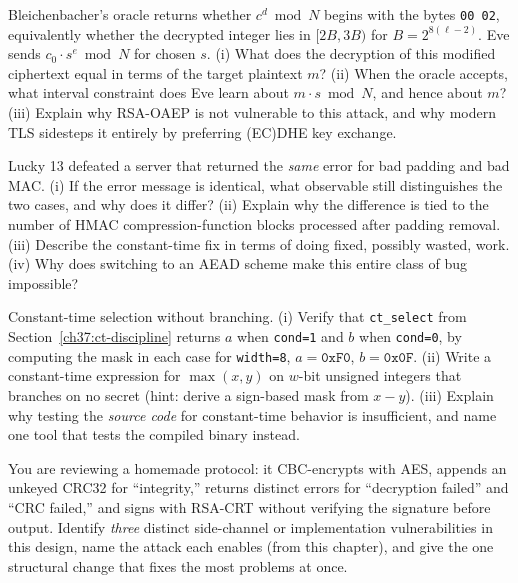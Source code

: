 \begin{exercise}
\label{ch37:ex-bleichenbacher}
Bleichenbacher's oracle returns whether $c^{d} \bmod N$ begins with the bytes \texttt{00 02}, equivalently whether the decrypted integer lies in $[2B, 3B)$ for $B = 2^{8(\ell-2)}$. Eve sends $c_0 \cdot s^{e} \bmod N$ for chosen $s$. (i) What does the decryption of this modified ciphertext equal in terms of the target plaintext $m$? (ii) When the oracle accepts, what interval constraint does Eve learn about $m \cdot s \bmod N$, and hence about $m$? (iii) Explain why RSA-OAEP is not vulnerable to this attack, and why modern TLS sidesteps it entirely by preferring (EC)DHE key exchange.
\end{exercise}

\begin{exercise}
\label{ch37:ex-lucky13}
Lucky 13 defeated a server that returned the \emph{same} error for bad padding and bad MAC. (i) If the error message is identical, what observable still distinguishes the two cases, and why does it differ? (ii) Explain why the difference is tied to the number of HMAC compression-function blocks processed after padding removal. (iii) Describe the constant-time fix in terms of doing fixed, possibly wasted, work. (iv) Why does switching to an AEAD scheme make this entire class of bug impossible?
\end{exercise}

\begin{exercise}
\label{ch37:ex-ct-select}
Constant-time selection without branching. (i) Verify that \texttt{ct\_select} from Section~\ref{ch37:ct-discipline} returns $a$ when \texttt{cond=1} and $b$ when \texttt{cond=0}, by computing the mask in each case for \texttt{width=8}, $a = \texttt{0xF0}$, $b = \texttt{0x0F}$. (ii) Write a constant-time expression for $\max(x, y)$ on $w$-bit unsigned integers that branches on no secret (hint: derive a sign-based mask from $x - y$). (iii) Explain why testing the \emph{source code} for constant-time behavior is insufficient, and name one tool that tests the compiled binary instead.
\end{exercise}

\begin{exercise}
\label{ch37:ex-design}
You are reviewing a homemade protocol: it CBC-encrypts with AES, appends an unkeyed CRC32 for ``integrity,'' returns distinct errors for ``decryption failed'' and ``CRC failed,'' and signs with RSA-CRT without verifying the signature before output. Identify \emph{three} distinct side-channel or implementation vulnerabilities in this design, name the attack each enables (from this chapter), and give the one structural change that fixes the most problems at once.
\end{exercise}
